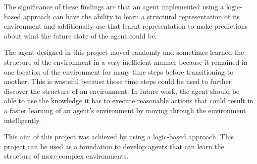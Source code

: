 The significance of these findings are that an agent implemented using a logic-based approach can have the ability to learn a structural representation of its environment and additionally use that learnt representation to make predictions about what the future state of the agent could be.


The agent designed in this project moved randomly and sometimes learned the structure of the environment in a very inefficient manner because it remained in one location of the environment for many time steps before transitioning to another. This is wasteful because those time steps could be used to further discover the structure of an environment. In future work, the agent should be able to use the knowledge it has to execute reasonable actions that could result in a faster learning of an agent's environment by moving through the environment intelligently.

This aim of this project was achieved by using a logic-based approach. This project can be used as a foundation to develop agents that can learn the structure of more complex environments.  














